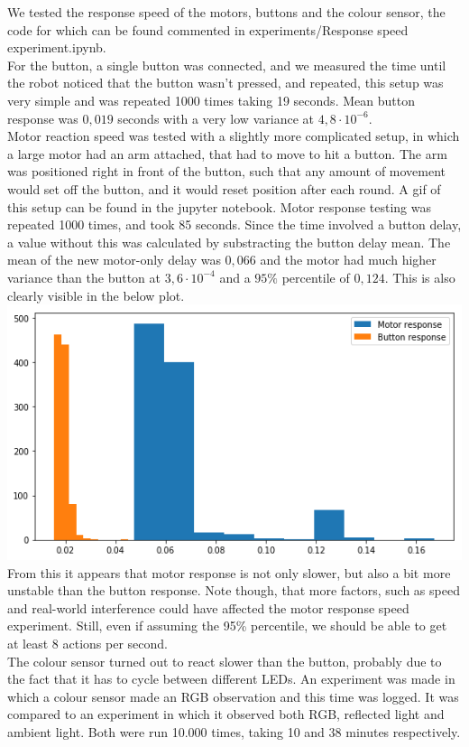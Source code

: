 \documentclass[11pt, a4paper]{article}
\begin{document}
We tested the response speed of the motors, buttons and the colour sensor, the code for which can be found commented in experiments/Response speed experiment.ipynb. \\
For the button, a single button was connected, and we measured the time until the robot noticed that the button wasn't pressed, and repeated, this setup was very simple and was repeated 1000 times taking 19 seconds. Mean button response was $0,019$ seconds with a very low variance at $4,8\cdot 10^{-6}$. \\
Motor reaction speed was tested with a slightly more complicated setup, in which a large motor had an arm attached, that had to move to hit a button. The arm was positioned right in front of the button, such that any amount of movement would set off the button, and it would reset position after each round. A gif of this setup can be found in the jupyter notebook. Motor response testing was repeated 1000 times, and took 85 seconds. Since the time involved a button delay, a value without this was calculated by substracting the button delay mean. The mean of the new motor-only delay was $0,066$ and the motor had much higher variance than the button at $3,6\cdot 10^{-4}$ and a $95\%$ percentile of $0,124$. This is also clearly visible in the below plot. \\
\includegraphics[scale=0.7]{images/motor_button_response_histogram.png} \\
From this it appears that motor response is not only slower, but also a bit more unstable than the button response. Note though, that more factors, such as speed and real-world interference could have affected the motor response speed experiment. Still, even if assuming the 95\% percentile, we should be able to get at least 8 actions per second.\\
The colour sensor turned out to react slower than the button, probably due to the fact that it has to cycle between different LEDs. An experiment was made in which a colour sensor made an RGB observation and this time was logged. It was compared to an experiment in which it observed both RGB, reflected light and ambient light. Both were run 10.000 times, taking 10 and 38 minutes respectively. \\
\end{document}
